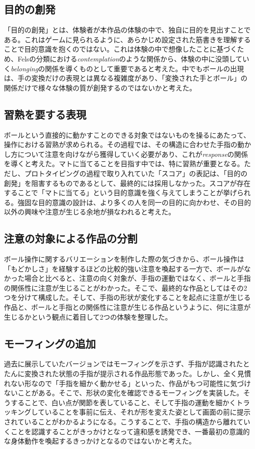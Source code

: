 \subsection{目的の創発}
「目的の創発」とは、体験者が本作品の体験の中で、独自に目的を見出すことである。これはゲームに見られるように、あらかじめ設定された筋書きを理解することで目的意識を抱くのではない。これは体験の中で想像したことに基づくため、Felsの分類における\textit{contemplation}のような関係から、体験の中に没頭していく\textit{belonging}の関係を導くものとして重要であると考えた。中でもボールの出現は、手の変換だけの表現とは異なる複雑度があり、「変換された手とボール」の関係だけで様々な体験の質が創発するのではないかと考えた。

\subsection{習熟を要する表現}
ボールという直接的に動かすことのできる対象ではないものを操るにあたって、操作における習熟が求められる。その過程では、その構造に合わせた手指の動かし方について注意を向けながら獲得していく必要があり、これが\textit{response}の関係を導くと考えた。マトに当てることを目指す中では、特に習熟が重要となる。ただし、プロトタイピングの過程で取り入れていた「スコア」の表記は、「目的の創発」を阻害するものであるとして、最終的には採用しなかった。スコアが存在することで「マトに当てる」という目的意識を強く与えてしまうことが挙げられる。強固な目的意識の設計は、より多くの人を同一の目的に向かわせ、その目的以外の興味や注意が生じる余地が損なわれると考えた。

\subsection{注意の対象による作品の分割}
ボール操作に関するバリエーションを制作した際の気づきから、ボール操作は「もどかしさ」を経験するほどの比較的強い注意を喚起する一方で、ボールがなかった場合と比べると、注意の向く対象が、手指の運動ではなく、ボールと手指の関係性に注意が生じることがわかった。そこで、最終的な作品としてはその2つを分けて構成した。そして、手指の形状が変化することを起点に注意が生じる作品と、ボールと手指との関係性に注意が生じる作品というように、何に注意が生じるかという観点に着目して2つの体験を整理した。

\subsection{モーフィングの追加}
過去に展示していたバージョンではモーフィングを示さず、手指が認識されたとたんに変換された状態の手指が提示される作品形態であった。しかし、全く見慣れない形なので「手指を細かく動かせる」といった、作品がもつ可能性に気づけないことがある。そこで、形状の変化を確認できるモーフィングを実装した。そうすることで、白い点が関節を表していること、そして手指の運動を細かくトラッキングしていることを事前に伝え、それが形を変えた姿として画面の前に提示されていることがわかるようになる。こうすることで、手指の構造から離れていくことを認識することがきっかけとなって違和感を誘発でき、一番最初の意識的な身体動作を喚起するきっかけとなるのではないかと考えた。

